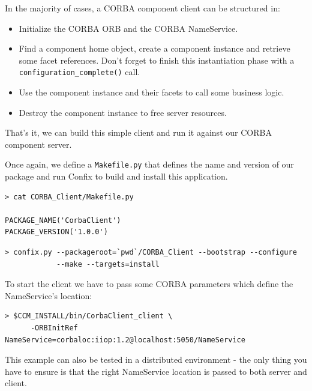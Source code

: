 In the majority of cases, a CORBA component client can be structured in:
\begin{itemize}
\item Initialize the CORBA ORB and the CORBA NameService.

\item Find a component home object, create a component instance and retrieve 
some facet references. Don't forget to finish this instantiation phase with a
{\tt configuration\_complete()} call.

\item Use the component instance and their facets to call some business
logic.

\item Destroy the component instance to free server resources.
\end{itemize} 

That's it, we can build this simple client and run it against our CORBA
component server.

Once again, we define a {\tt Makefile.py} that defines the name and version
of our package and run Confix to build and install this application.
\begin{small}
\begin{verbatim}
> cat CORBA_Client/Makefile.py

PACKAGE_NAME('CorbaClient')
PACKAGE_VERSION('1.0.0')
\end{verbatim}
\end{small}

\begin{small}
\begin{verbatim}
> confix.py --packageroot=`pwd`/CORBA_Client --bootstrap --configure 
            --make --targets=install
\end{verbatim}
\end{small}

To start the client we have to pass some CORBA parameters which define 
the NameService's location:

\begin{small}
\begin{verbatim}
> $CCM_INSTALL/bin/CorbaClient_client \
      -ORBInitRef NameService=corbaloc:iiop:1.2@localhost:5050/NameService
\end{verbatim}
\end{small}

This example can also be tested in a distributed environment - the only thing
you have to ensure is that the right NameService location is passed to both
server and client.


